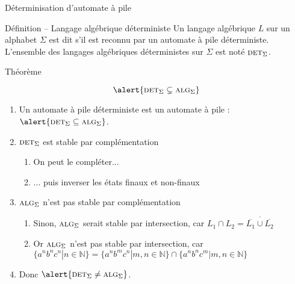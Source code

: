 
\begingroup

\begin{frame}{Déterminisation d'automate à pile}
  \begin{block}{Définition -- Langage algébrique déterministe}
    Un langage algébrique $L$ sur un alphabet $\Sigma$ est dit  s'il est reconnu par un automate à pile déterministe.
    L'ensemble des langages algébriques déterministes sur $\Sigma$ est noté $\textsc{det}_\Sigma$.
  \end{block}
  
  \begin{block}{Théorème}
    
    \vspace{-4mm}
    $$\alert{\textsc{det}_\Sigma \subsetneq \textsc{alg}_\Sigma}$$

    \vspace{-1mm}
    \begin{enumerate}
    \item Un automate à pile déterministe est un automate à pile : $\alert{\textsc{det}_\Sigma \subseteq \textsc{alg}_\Sigma}$.
    \item $\textsc{det}_\Sigma$ est stable par complémentation
      \begin{enumerate}
      \item On peut le compléter...
      \item ... puis inverser les états finaux et non-finaux
      \end{enumerate}
    \item $\textsc{alg}_\Sigma$ n'est pas stable par complémentation
      \begin{enumerate}
      \item Sinon, $\textsc{alg}_\Sigma$ serait stable par intersection, car $L_1 \cap L_2 = \overline{\overline{L_1} \cup \overline{L_2}}$
      \item Or $\textsc{alg}_\Sigma$ n'est pas stable par intersection, car $\{a^n b^n c^n | n\in \mathbb{N}\} = \{a^n b^m c^n | m, n\in \mathbb{N}\} \cap \{a^n b^n c^m | m, n\in \mathbb{N}\}$
      \end{enumerate}
    \item Donc $\alert{\textsc{det}_\Sigma \neq \textsc{alg}_\Sigma}$.
    \end{enumerate}
  \end{block}
\end{frame}

\endgroup
